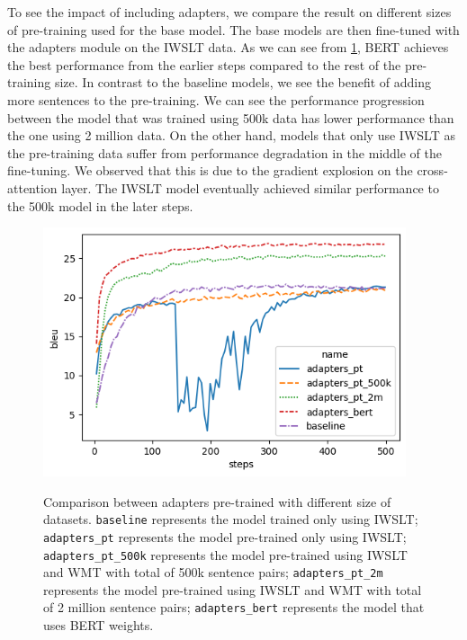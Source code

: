 To see the impact of including adapters, we compare the result on different sizes of pre-training used for the base model. The base models are then fine-tuned with the adapters module on the IWSLT data. As we can see from \cref{img:adpcomp}, BERT achieves the best performance from the earlier steps compared to the rest of the pre-training size. In contrast to the baseline models, we see the benefit of adding more sentences to the pre-training. We can see the performance progression between the model that was trained using 500k data has lower performance than the one using 2 million data. On the other hand, models that only use IWSLT as the pre-training data suffer from performance degradation in the middle of the fine-tuning. We observed that this is due to the gradient explosion on the cross-attention layer. The IWSLT model eventually achieved similar performance to the 500k model in the later steps.
\begin{figure}[h]
    {\includegraphics[width=0.95\textwidth]{img/adapterscomparison.png}}
    \centering
    \caption{
        Comparison between adapters pre-trained with different size of datasets. \texttt{baseline} represents the model trained only using IWSLT; \texttt{adapters\_pt} represents the model pre-trained only using IWSLT; \texttt{adapters\_pt\_500k} represents the model pre-trained using IWSLT and WMT with total of 500k sentence pairs; \texttt{adapters\_pt\_2m} represents the model pre-trained using IWSLT and WMT with total of 2 million sentence pairs; \texttt{adapters\_bert} represents the model that uses BERT weights.}
    \label{img:adpcomp}
\end{figure}


